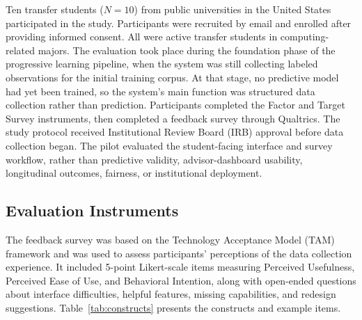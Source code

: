 \documentclass[letterpaper,11pt]{article}
\begin{document}
%
%
Ten transfer students ($N=10$) from public universities in the United States participated in the study. Participants were recruited by email and enrolled after providing informed consent. All were active transfer students in computing-related majors. The evaluation took place during the foundation phase of the progressive learning pipeline, when the system was still collecting labeled observations for the initial training corpus. At that stage, no predictive model had yet been trained, so the system's main function was structured data collection rather than prediction. Participants completed the Factor and Target Survey instruments, then completed a feedback survey through Qualtrics. The study protocol received Institutional Review Board (IRB) approval before data collection began. The pilot evaluated the student-facing interface and survey workflow, rather than predictive validity, advisor-dashboard usability, longitudinal outcomes, fairness, or institutional deployment.

\subsection{Evaluation Instruments}\label{subsec:instruments}

The feedback survey was based on the Technology Acceptance Model (TAM) framework \parencite{davis1989} and was used to assess participants' perceptions of the data collection experience. It included 5-point Likert-scale items measuring Perceived Usefulness, Perceived Ease of Use, and Behavioral Intention, along with open-ended questions about interface difficulties, helpful features, missing capabilities, and redesign suggestions. Table~\ref{tab:constructs} presents the constructs and example items.
\end{document}
